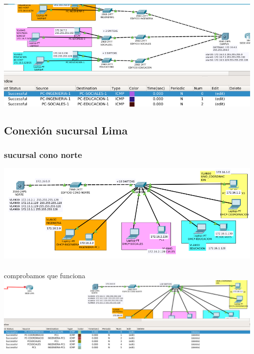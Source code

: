 \includegraphics[scale=0.5]{img/VLANCAMPUSSUCESS.png} 
\subsection{Conexi\'on sucursal Lima}
\subsubsection{sucursal cono norte}
\includegraphics[scale=0.45]{img/VLANNORTE.png} \\
\\comprobamos que funciona\\
\includegraphics[scale=0.35]{img/NORTESUCCESS.png} 
